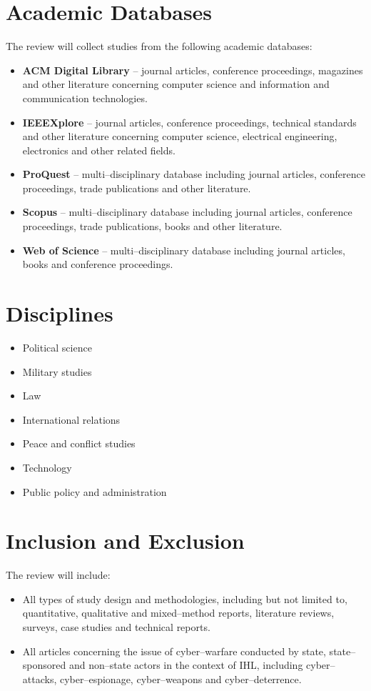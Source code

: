 \documentclass[british]{article}
\begin{document}
\section{Academic Databases}

The review will collect studies from the following academic databases: 
\begin{itemize}
\item \textbf{ACM Digital Library} -- journal articles, conference proceedings,
magazines and other literature concerning computer science and information
and communication technologies. 
\item \textbf{IEEEXplore} -- journal articles, conference proceedings,
technical standards and other literature concerning computer science,
electrical engineering, electronics and other related fields.
\item \textbf{ProQuest }-- multi--disciplinary database including journal
articles, conference proceedings, trade publications and other literature. 
\item \textbf{Scopus} -- multi--disciplinary database including journal
articles, conference proceedings, trade publications, books and other
literature. 
\item \textbf{Web of Science} -- multi--disciplinary database including
journal articles, books and conference proceedings. 
\end{itemize}

\section{Disciplines}
\begin{itemize}
\item Political science
\item Military studies
\item Law
\item International relations
\item Peace and conflict studies
\item Technology
\item Public policy and administration
\end{itemize}

\section{Inclusion and Exclusion}

The review will include:
\begin{itemize}
\item All types of study design and methodologies, including but not limited
to, quantitative, qualitative and mixed--method reports, literature
reviews, surveys, case studies and technical reports. 
\item All articles concerning the issue of cyber--warfare conducted by
state, state--sponsored and non--state actors in the context of
IHL, including cyber--attacks, cyber--espionage, cyber--weapons
and cyber--deterrence. 
\end{itemize}
\newpage{}
\end{document}
